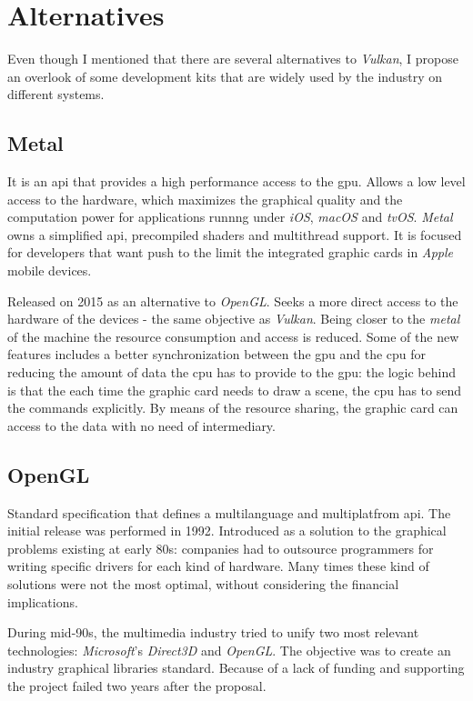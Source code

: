 \chapter{Alternatives}
Even though I mentioned that there are several alternatives to \emph{Vulkan}, I propose an overlook of some development
kits that are widely used by the industry on different systems.

\section{Metal}
It is an \gls{api} that provides a high performance access to the \gls{gpu}. Allows a low level access to the hardware,
which maximizes the graphical quality and the computation power for applications runnng under \emph{iOS}, \emph{macOS}
and \emph{tvOS}. \emph{Metal} owns a simplified \gls{api}, precompiled shaders and multithread support. It is focused
for developers that want push to the limit the integrated graphic cards in \emph{Apple} mobile devices.

Released on 2015 as an alternative to \emph{OpenGL}. Seeks a more direct access to the hardware of the devices - the
same objective as \emph{Vulkan}. Being closer to the \emph{metal} of the machine the resource consumption and access
is reduced. Some of the new features includes a better synchronization between the \gls{gpu} and the \gls{cpu} for
reducing the amount of data the \gls{cpu} has to provide to the \gls{gpu}: the logic behind is that the each time the
graphic card needs to draw a scene, the \gls{cpu} has to send the commands explicitly. By means of the resource
sharing, the graphic card can access to the data with no need of intermediary.

\section{OpenGL}
Standard specification that defines a multilanguage and multiplatfrom \gls{api}. The initial release was performed
in 1992. Introduced as a solution to the graphical problems existing at early 80s: companies had to outsource
programmers for writing specific drivers for each kind of hardware. Many times these kind of solutions were not the
most optimal, without considering the financial implications.

During mid-90s, the multimedia industry tried to unify two most relevant technologies: \emph{Microsoft}'s
\emph{Direct3D} and \emph{OpenGL}. The objective was to create an industry graphical libraries standard. Because of a
lack of funding and supporting the project failed two years after the proposal.


